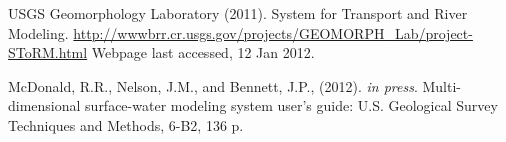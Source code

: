 \documentclass[12pt]{article}
\begin{document}
\begin{thebibliography}{}

{USGS Geomorphology Laboratory} (2011).
\newblock System for Transport and River Modeling.   
\url{http://wwwbrr.cr.usgs.gov/projects/GEOMORPH_Lab/project-SToRM.html} Webpage last accessed, 12 Jan 2012.

{McDonald, R.R., Nelson, J.M., and Bennett, J.P.}, (2012).  
\textsl{in press}. Multi-dimensional surface-water modeling system user's guide: U.S. Geological Survey Techniques and Methods, 6-B2, 136 p.

%


\end{thebibliography}
\end{document}
